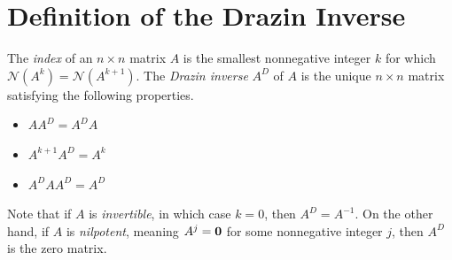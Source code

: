 \label{lab:drazin_inverse}



\section*{Definition of the Drazin Inverse} %

The \emph{index} of an $n \times n$ matrix $A$ is the smallest nonnegative integer $k$ for which $\mathscr{N}(A^k) = \mathscr{N}(A^{k+1})$.
The \emph{Drazin inverse} $A^D$ of $A$ is the unique $n \times n$ matrix satisfying the following properties.
\begin{itemize}
\item $ AA^{D} =  A^{D}A$
\item $A^{k+1}A^D = A^k$
\item $A^DAA^D = A^D$
\end{itemize}
Note that if $A$ is \emph{invertible}, in which case $k=0$, then $A^D = A^{-1}$.
On the other hand, if $A$ is \emph{nilpotent}, meaning $A^j = \mathbf{0}$ for some nonnegative integer $j$, then $A^D$ is the zero matrix.

